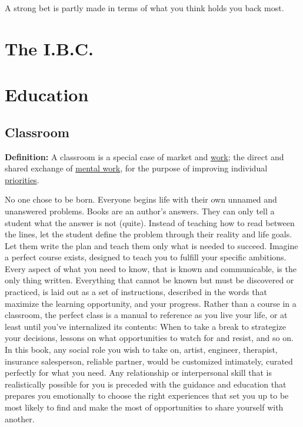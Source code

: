 \documentclass[
]{book}
\begin{document}
A strong bet is partly made in terms of what you think holds you back most.

\chapter*{The I.B.C.}\label{the-i.b.c.}

\chapter{Education}\label{education}

\section{Classroom}\label{classroom}

\textbf{Definition:} A classroom is a special case of market and \hyperref[work]{work}; the direct and shared exchange of \hyperref[analysis]{mental work}, for the purpose of improving individual \hyperref[priorities]{priorities}.

No one chose to be born.
Everyone begins life with their own unnamed and unanswered problems.
Books are an author's answers.
They can only tell a student what the answer is not (quite).
Instead of teaching how to read between the lines, let the student define the problem through their reality and life goals.
Let them write the plan and teach them only what is needed to succeed.
Imagine a perfect course exists, designed to teach you to fulfill your specific ambitions.
Every aspect of what you need to know, that is known and communicable, is the only thing written.
Everything that cannot be known but must be discovered or practiced, is laid out as a set of instructions, described in the words that maximize the learning opportunity, and your progress.
Rather than a course in a classroom, the perfect class is a manual to reference as you live your life, or at least until you've internalized its contents:
When to take a break to strategize your decisions, lessons on what opportunities to watch for and resist, and so on.
In this book, any social role you wish to take on, artist, engineer, therapist, insurance salesperson, reliable partner, would be customized intimately, curated perfectly for what you need.
Any relationship or interpersonal skill that is realistically possible for you is preceded with the guidance and education that prepares you emotionally to choose the right experiences that set you up to be most likely to find and make the most of opportunities to share yourself with another.
\end{document}
